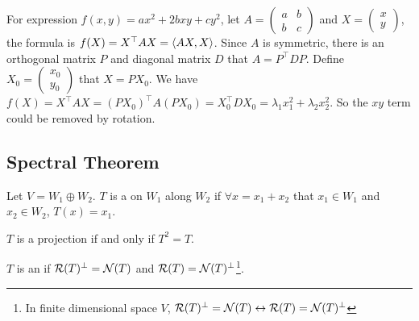 \begin{theorem}
    For expression $f(x,y) = a x^2 + 2b xy + c y^2$, let $A = \begin{pmatrix}
        a & b \\
        b & c
    \end{pmatrix}$ and $X = \begin{pmatrix}
        x \\
        y
    \end{pmatrix}$, the formula is $f(X) = X^\top A X = \left\langle \displaystyle AX, X \right\rangle$. Since $A$ is symmetric, there is an orthogonal matrix $P$ and diagonal matrix $D$ that $A = P^\top D P$. Define $X_0 = \begin{pmatrix}
        x_0 \\
        y_0
    \end{pmatrix}$ that $X = PX_0$. We have $f(X) = X^\top A X = (P X_0)^\top A (P X_0) = X_0^\top D X_0 = \lambda_1 x_1^2 + \lambda_2 x_2^2$. So the $xy$ term could be removed by rotation.
\end{theorem}







\subsection{Spectral Theorem}

\begin{definition}
    Let $V = W_1 \oplus W_2$. $T$ is a  on $W_1$ along $W_2$ if $\forall x = x_1 + x_2$ that $x_1 \in W_1$ and $x_2 \in W_2$, $T(x) = x_1$.
\end{definition}

\begin{theorem}
    $T$ is a projection if and only if $T^2 = T$.
\end{theorem}

\begin{definition}
    $T$ is an  if $\mathcal{R}(T)^\bot = \mathcal{N}(T)$ and $\mathcal{R}(T)= \mathcal{N}(T)^\bot$\footnote{In finite dimensional space $V$, $\mathcal{R}(T)^\bot = \mathcal{N}(T) \leftrightarrow \mathcal{R}(T)= \mathcal{N}(T)^\bot$}. 
\end{definition}



